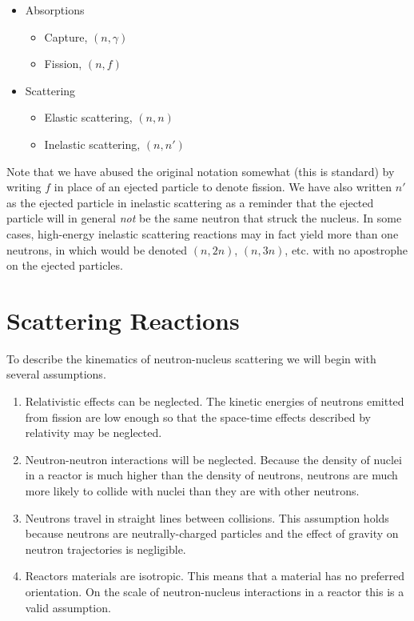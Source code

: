 \documentclass[11pt]{article}
\begin{document}
\begin{itemize}
\item Absorptions
\begin{itemize}
\item Capture, \((n,\gamma)\)
\item Fission, \((n,f)\)
\end{itemize}
\item Scattering
\begin{itemize}
\item Elastic scattering, \((n,n)\)
\item Inelastic scattering, \((n,n')\)
\end{itemize}
\end{itemize}

Note that we have abused the original notation somewhat (this is standard) by writing \(f\) in place of an ejected particle to denote fission.  We have also written \(n'\) as the ejected particle in inelastic scattering as a reminder that the ejected particle will in general \emph{not} be the same neutron that struck the nucleus.  In some cases, high-energy inelastic scattering reactions may in fact yield more than one neutrons, in which would be denoted \((n,2n)\), \((n,3n)\), etc. with no apostrophe on the ejected particles.

\section{Scattering Reactions}
\label{sec:orgheadline9}
To describe the kinematics of neutron-nucleus scattering we will begin with several assumptions.
\begin{enumerate}
\item Relativistic effects can be neglected.  The kinetic energies of neutrons emitted from fission are low enough so that the space-time effects described by relativity may be neglected.
\item Neutron-neutron interactions will be neglected.  Because the density of nuclei in a reactor is much higher than the density of neutrons, neutrons are much more likely to collide with nuclei than they are with other neutrons.
\item Neutrons travel in straight lines between collisions.  This assumption holds because neutrons are neutrally-charged particles and the effect of gravity on neutron trajectories is negligible.
\item Reactors materials are isotropic.  This means that a material has no preferred orientation.  On the scale of neutron-nucleus interactions in a reactor this is a valid assumption.
\end{enumerate}
\end{document}
